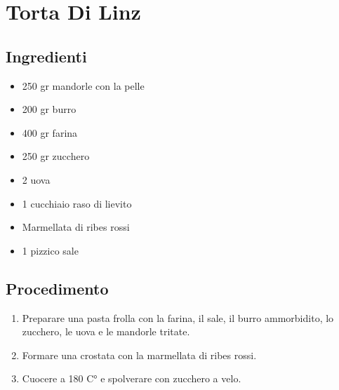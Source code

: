 \section{Torta Di Linz}
\subsection{Ingredienti}
\begin{itemize}
\item 250 gr mandorle con la pelle  
\item 200 gr burro  
\item 400 gr farina  
\item 250 gr zucchero  
\item 2 uova  
\item 1 cucchiaio raso di lievito  
\item Marmellata di ribes rossi   
\item 1 pizzico sale
\end{itemize}
\subsection{Procedimento}
\begin{enumerate}
\item  Preparare una pasta frolla con la farina, il sale, il burro ammorbidito, lo zucchero, le uova e le mandorle tritate.   
\item  Formare una crostata con la marmellata di ribes rossi.   
\item  Cuocere a 180 C° e spolverare con zucchero a velo.
\end{enumerate}
